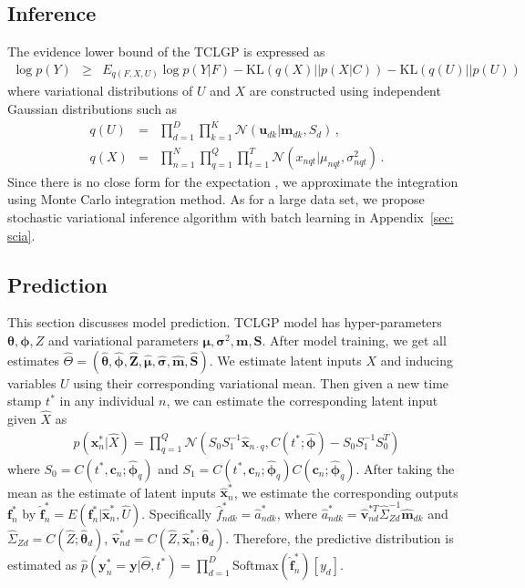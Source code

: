 \documentclass{article}
\begin{document}
\subsection{Inference}
The evidence lower bound of the TCLGP is expressed as
\begin{eqnarray}
\log p(Y) & \geq & E_{q(F,X,U)}\log p(Y|F) - \mathrm{KL}(q(X)||p(X|C)) - \mathrm{KL}(q(U)||p(U)) \nonumber 
\end{eqnarray}
where variational distributions of $U$ and $X$ are constructed using independent Gaussian distributions such as 
\begin{eqnarray}
q(U) & = & \prod_{d = 1}^{D}\prod_{k = 1}^{K}\mathcal{N}(\bm u_{dk}| \bm m_{dk}, S_d)\,, \nonumber \\
q(X) & = & \prod_{n = 1}^{N}\prod_{q = 1}^{Q}\prod_{t = 1}^{T} \mathcal{N}(x_{nqt}| \mu_{nqt}, \sigma_{nqt}^2)\,. \nonumber
\end{eqnarray}
Since there is no close form for the expectation \citep{Gal_2015}, we approximate the integration using Monte Carlo integration method. As for a large data set, we propose stochastic variational inference algorithm with batch learning in Appendix~\ref{sec: scia}.

\subsection{Prediction}
This section discusses model prediction. TCLGP model has hyper-parameters $\bm\theta, \bm\phi, Z$ and variational parameters $\bm \mu, \bm \sigma^2, \bm m, \bm S$. After model training, we get all estimates $\hat{\varTheta} = (\hat{\bm \theta}, \hat{\bm \phi}, \hat{\bm Z}, \hat{\bm \mu}, \hat{\bm \sigma}, \hat{\bm m}, \hat{\bm S})$. We estimate latent inputs $X$ and inducing variables $U$ using their corresponding variational mean. Then given a new time stamp $t^*$ in any individual $n$, we can estimate the corresponding latent input given $\hat{X}$ as 
\begin{eqnarray}
p(\bm x_n^*|\hat{X}) = \prod_{q = 1}^{Q}\mathcal{N}(S_0 S_1^{-1}\hat{\bm x}_{n\cdot q}, C(t^*; \hat{\bm \phi}) - S_0 S_1^{-1}S_0^T)
\end{eqnarray}
where $S_0 = C(t^*, \bm c_n; \hat{\bm \phi}_q)$ and $S_1 = C(t^*, \bm c_n; \hat{\bm \phi}_q)C(\bm c_n; \hat{\bm \phi}_q)$. After taking the mean as the estimate of latent inputs $\hat{\bm x}_n^*$, we estimate the corresponding outputs $\bm f_n^*$ by $\hat{\bm f}_n^* = E(\bm f_n^*|\hat{\bm x}_n^*, \hat{U})$. Specifically $\hat{f}^*_{ndk} = \hat{a}_{ndk}^*$, where  $\hat{a}_{ndk}^* = \hat{\bm v}^{*T}_{nd}\hat{\Sigma}_{Zd}^{-1}\hat{\bm m}_{dk}$ and $\hat{\Sigma}_{Zd} = C(\hat{Z}; \hat{\bm \theta}_d)$, $\hat{\bm v}_{nd}^* = C(\hat{Z}, \hat{\bm x}_n^*; \hat{\bm \theta}_d)$. Therefore, the predictive distribution is estimated as $\hat{p}(\bm y_n^* = \bm y|\hat{\varTheta}, t^*) = \prod_{d = 1}^D \mathrm{Softmax}(\hat{\bm f}_n^*)[y_d]$.
\end{document}
